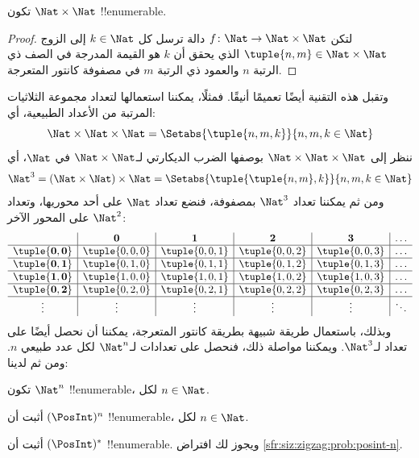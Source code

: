 \documentclass[../../../include/open-logic-section]{subfiles}
\begin{document}
\begin{prop}
تكون $\Nat \times \Nat$ !!{enumerable}.
\end{prop}

\begin{proof}
لتكن $f \colon \Nat \to \Nat\times\Nat$ دالة ترسل كل $k \in \Nat$
إلى الزوج $\tuple{n,m} \in \Nat \times \Nat$ الذي يحقق أن $k$ هو
القيمة المدرجة في الصف ذي الرتبة $n$ والعمود ذي الرتبة $m$ في مصفوفة
كانتور المتعرجة.
\end{proof}

\begin{explain}
وتقبل هذه التقنية أيضًا تعميمًا أنيقًا. فمثلًا، يمكننا استعمالها لتعداد
مجموعة الثلاثيات المرتبة من الأعداد الطبيعية، أي:
\[
\Nat \times \Nat \times \Nat = \Setabs{\tuple{n,m,k}}{n,m,k \in \Nat}
\]
ننظر إلى $\Nat \times \Nat \times \Nat$ بوصفها الضرب الديكارتي
لـ$\Nat \times \Nat$ في $\Nat$، أي
\[
\Nat^3 = (\Nat \times \Nat) \times \Nat =
\Setabs{\tuple{\tuple{n,m},k}}{n, m, k
  \in \Nat }
\]
ومن ثم يمكننا تعداد $\Nat^3$ بمصفوفة، فنضع تعداد $\Nat$ على أحد
محوريها، وتعداد $\Nat^2$ على المحور الآخر:
\[
\begin{array}{ c | c | c | c | c | c}
& \mathbf 0 & \mathbf 1 & \mathbf 2 & \mathbf 3 & \dots \\
\hline
\mathbf{\tuple{0,0}} & \tuple{0,0,0} & \tuple{0,0,1} & \tuple{0,0,2} & \tuple{0,0,3} & \dots \\
\hline
\mathbf{\tuple{0,1}} & \tuple{0,1,0} & \tuple{0,1,1} & \tuple{0,1,2} & \tuple{0,1,3} & \dots \\
\hline
\mathbf{\tuple{1,0}} & \tuple{1,0,0} & \tuple{1,0,1} & \tuple{1,0,2} & \tuple{1,0,3} & \dots \\
\hline
\mathbf{\tuple{0,2}} & \tuple{0,2,0} & \tuple{0,2,1} & \tuple{0,2,2} & \tuple{0,2,3} & \dots\\
\hline
\vdots & \vdots & \vdots & \vdots & \vdots & \ddots \\
\end{array}
\]
وبذلك، باستعمال طريقة شبيهة بطريقة كانتور المتعرجة، يمكننا أن نحصل
أيضًا على تعداد لـ$\Nat^3$. ويمكننا مواصلة ذلك، فنحصل على تعدادات
لـ$\Nat^n$ لكل عدد طبيعي $n$. ومن ثم لدينا:
\end{explain}

\begin{prop}
تكون $\Nat^n$ !!{enumerable}، لكل $n \in \Nat$.
\end{prop}

\begin{prob}\label{sfr:siz:zigzag:prob:posint-n}
أثبت أن $(\PosInt)^n$ !!{enumerable}، لكل $n \in \Nat$.
\end{prob}

\begin{prob}\label{sfr:siz:zigzag:prob:posint-star}
  أثبت أن $(\PosInt)^*$ !!{enumerable}. ويجوز لك افتراض \cref{sfr:siz:zigzag:prob:posint-n}.
\end{prob}
\end{document}
